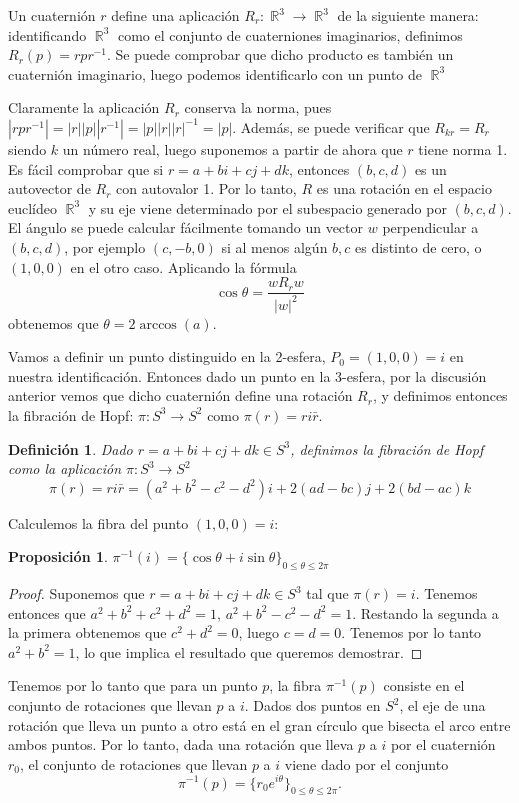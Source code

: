 \documentclass[11pt]{diazessay} %
\newtheorem{definition}{Definición}
\newtheorem{proposition}{Proposición}
\DeclareMathOperator{\R}{\mathbb{R}}
\begin{document}
Un cuaternión $r$ define una aplicación $R_r:\R^3\to\R^3$ de la siguiente manera: identificando $\R^3$ como el conjunto de cuaterniones imaginarios, definimos $R_r(p) = rpr^{-1}$. Se puede comprobar que dicho producto es también un cuaternión imaginario, luego podemos identificarlo con un punto de $\R^3$

Claramente la aplicación $R_r$ conserva la norma, pues $|rpr^{-1}|=|r||p||r^{-1}|=|p||r||r|^{-1}=|p|$. Además, se puede verificar que $R_{kr} = R_r$ siendo $k$ un número real, luego suponemos a partir de ahora que $r$ tiene norma 1. Es fácil comprobar que si $r=a+bi+cj+dk$, entonces $(b,c,d)$ es un autovector de $R_r$ con autovalor 1. Por lo tanto, $R$ es una rotación en el espacio euclídeo $\R^3$ y su eje viene determinado por el subespacio generado por $(b,c,d)$. El ángulo se puede calcular fácilmente tomando un vector $w$ perpendicular a $(b,c,d)$, por ejemplo $(c,-b,0)$ si al menos algún $b,c$ es distinto de cero, o $(1,0,0)$ en el otro caso. Aplicando la fórmula
\[\cos\theta = \frac{wR_rw}{|w|^2}\]
obtenemos que $\theta = 2\arccos(a)$.

Vamos a definir un punto distinguido en la 2-esfera, $P_0=(1,0,0)=i$ en nuestra identificación. Entonces dado un punto en la 3-esfera, por la discusión anterior vemos que dicho cuaternión define una rotación $R_r$, y definimos entonces la fibración de Hopf: $\pi:S^3\to S^2$ como $\pi(r)=ri\bar{r}$.

\begin{definition}
    Dado $r=a+bi+cj+dk\in S^3$, definimos la fibración de Hopf como la aplicación $\pi:S^3\to S^2$
    \[\pi(r)=ri\bar{r}=(a^2+b^2-c^2-d^2)i+2(ad-bc)j+2(bd-ac)k\]
\end{definition}

Calculemos la fibra del punto $(1,0,0)=i$:

\begin{proposition}
    $\pi^{-1}(i)=\{\cos\theta+i\sin\theta\}_{0\leq\theta\leq 2\pi}$
\end{proposition}
\begin{proof}
    Suponemos que $r=a+bi+cj+dk\in S^3$ tal que $\pi(r)=i$. Tenemos entonces que $a^2+b^2+c^2+d^2=1$, $a^2+b^2-c^2-d^2=1$. Restando la segunda a la primera obtenemos que $c^2+d^2=0$, luego $c=d=0$. Tenemos por lo tanto $a^2+b^2=1$, lo que implica el resultado que queremos demostrar.
\end{proof}

Tenemos por lo tanto que para un punto $p$, la fibra $\pi^{-1}(p)$ consiste en el conjunto de rotaciones que llevan $p$ a $i$. Dados dos puntos en $S^2$, el eje de una rotación que lleva un punto a otro está en el gran círculo que bisecta el arco entre ambos puntos. Por lo tanto, dada una rotación que lleva $p$ a $i$ por el cuaternión $r_0$, el conjunto de rotaciones que llevan $p$ a $i$ viene dado por el conjunto
\[\pi^{-1}(p) = \{r_0e^{i\theta}\}_{0\leq\theta\leq 2\pi}.\]
\end{document}

